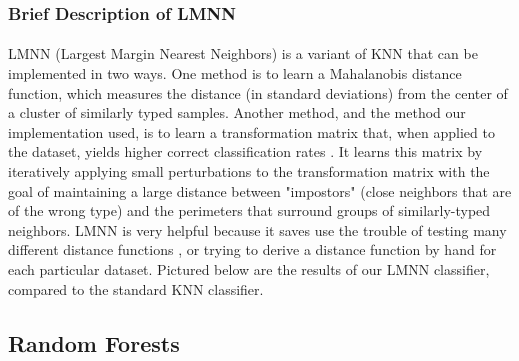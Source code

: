 \documentclass[11pt]{article}
\begin{document}
    \subsubsection{Brief Description of LMNN}
    \paragraph{}
    LMNN (Largest Margin Nearest Neighbors) is a variant of KNN that can be implemented in two ways. One method is to learn a Mahalanobis distance function, which measures the distance (in standard deviations) from the center of a cluster of similarly typed samples. Another method, and the method our implementation used, is to learn a transformation matrix that, when applied to the dataset, yields higher correct classification rates \cite{huyen12}. It learns this matrix by iteratively applying small perturbations to the transformation matrix with the goal of maintaining a large distance between "impostors" (close neighbors that are of the wrong type) and the perimeters that surround groups of similarly-typed neighbors. LMNN is very helpful because it saves use the trouble of testing many different distance functions \cite{weinberger}, or trying to derive a distance function by hand for each particular dataset. Pictured below are the results of our LMNN classifier, compared to the standard KNN classifier.
     
     
    \subsection{Random Forests}
\end{document}
